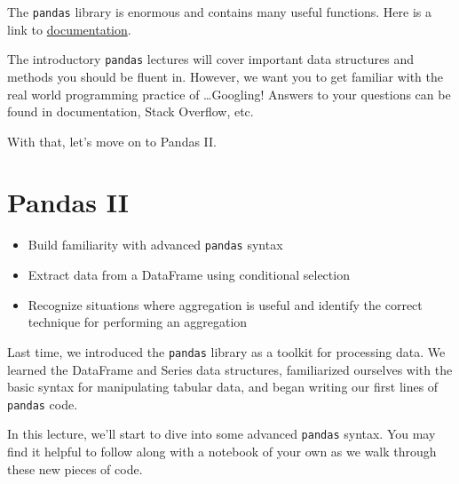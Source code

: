 \documentclass[
  letterpaper,
  DIV=11,
  numbers=noendperiod]{scrreprt}
\providecommand{\tightlist}{%
  \setlength{\itemsep}{0pt}\setlength{\parskip}{0pt}}\usepackage{longtable,booktabs,array}
\begin{document}
The \texttt{pandas} library is enormous and contains many useful
functions. Here is a link to
\href{https://pandas.pydata.org/docs/}{documentation}.

The introductory \texttt{pandas} lectures will cover important data
structures and methods you should be fluent in. However, we want you to
get familiar with the real world programming practice of
\ldots Googling! Answers to your questions can be found in
documentation, Stack Overflow, etc.

With that, let's move on to Pandas II.


\hypertarget{pandas-ii}{%
\chapter{Pandas II}\label{pandas-ii}}

\begin{tcolorbox}[enhanced jigsaw, toptitle=1mm, left=2mm, colback=white, bottomtitle=1mm, colbacktitle=quarto-callout-note-color!10!white, rightrule=.15mm, breakable, coltitle=black, colframe=quarto-callout-note-color-frame, title=\textcolor{quarto-callout-note-color}{\faInfo}\hspace{0.5em}{Note}, toprule=.15mm, titlerule=0mm, arc=.35mm, bottomrule=.15mm, leftrule=.75mm, opacityback=0, opacitybacktitle=0.6]

\begin{itemize}
\tightlist
\item
  Build familiarity with advanced \texttt{pandas} syntax
\item
  Extract data from a DataFrame using conditional selection
\item
  Recognize situations where aggregation is useful and identify the
  correct technique for performing an aggregation
\end{itemize}

\end{tcolorbox}

Last time, we introduced the \texttt{pandas} library as a toolkit for
processing data. We learned the DataFrame and Series data structures,
familiarized ourselves with the basic syntax for manipulating tabular
data, and began writing our first lines of \texttt{pandas} code.

In this lecture, we'll start to dive into some advanced \texttt{pandas}
syntax. You may find it helpful to follow along with a notebook of your
own as we walk through these new pieces of code.
\end{document}
